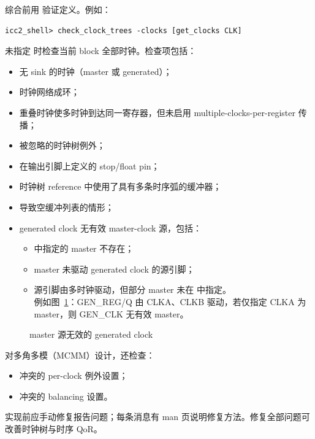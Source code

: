 综合前用  验证定义。例如：
\begin{lstlisting}
icc2_shell> check_clock_trees -clocks [get_clocks CLK]
\end{lstlisting}
未指定  时检查当前 block 全部时钟。检查项包括：
\begin{itemize}
  \item 无 sink 的时钟（master 或 generated）；
  \item 时钟网络成环；
  \item 重叠时钟使多时钟到达同一寄存器，但未启用 multiple-clocks-per-register 传播；
  \item 被忽略的时钟树例外；
  \item 在输出引脚上定义的 stop/float pin；
  \item 时钟树 reference 中使用了具有多条时序弧的缓冲器；
  \item 导致空缓冲列表的情形；
  \item generated clock 无有效 master-clock 源，包括：
        \begin{itemize}
          \item {} 中指定的 master 不存在；
          \item master 未驱动 generated clock 的源引脚；
          \item 源引脚由多时钟驱动，但部分 master 未在  中指定。\\
                例如图~\ref{fig:cts-invalid-master}：GEN\_REG/Q 由 CLKA、CLKB 驱动，若仅指定 CLKA 为 master，则 GEN\_CLK 无有效 master。
        \end{itemize}
\end{itemize}

\begin{figure}[htbp]
\centering
{}
\caption{master 源无效的 generated clock}
\label{fig:cts-invalid-master}
\end{figure}

对多角多模（MCMM）设计，还检查：
\begin{itemize}
  \item 冲突的 per-clock 例外设置；
  \item 冲突的 balancing 设置。
\end{itemize}
实现前应手动修复报告问题；每条消息有 man 页说明修复方法。修复全部问题可改善时钟树与时序 QoR。

